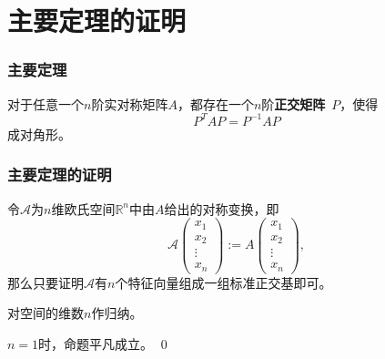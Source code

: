 
\section{主要定理的证明}


\begin{frame}
\frametitle{主要定理}

\begin{thm}
对于任意一个$n$阶实对称矩阵$A$，都存在一个$n$阶{\bfseries 正交矩阵}~$P$，使得
\[P^TAP = P^{-1}AP\]
成对角形。
\end{thm}

\end{frame}


\begin{frame}
\frametitle{主要定理的证明}

\startproof[bg=yellow, fg=red]
\vspace{0.3em}

\phantom{一一}令$\mathscr{A}$为$n$维欧氏空间$\mathbb{R}^n$中由$A$给出的对称变换，即
\[\mathscr{A} \begin{pmatrix} x_1 \\ x_2 \\ \vdots \\ x_n \end{pmatrix} := A \begin{pmatrix} x_1 \\ x_2 \\ \vdots \\ x_n \end{pmatrix},\]
那么只要证明$\mathscr{A}$有$n$个特征向量组成一组标准正交基即可。

\pause

\vspace{0.6em}

\phantom{一一}对空间的维数$n$作归纳。

\vspace{0.6em}

\phantom{一一}$n=1$时，命题平凡成立。
\renewcommand{\qedsymbol}{}
\qed

\end{frame}



